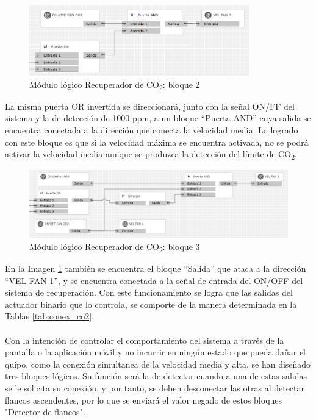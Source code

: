 \begin{figure}[H]
\centering
\includegraphics[width=0.85\textwidth]{figures/log_co2_b2.png}   
\caption{Módulo lógico Recuperador de CO\textsubscript{2}: bloque 2}
\label{fig:log_co2_b2}
\end{figure}
La misma puerta OR invertida se direccionará,  junto con la señal ON/FF del sistema y la de detección de 1000 ppm, a un bloque “Puerta AND” cuya salida se encuentra conectada a la dirección que conecta la velocidad media. Lo logrado con este bloque es que si la velocidad máxima se encuentra activada, no se podrá activar la velocidad media aunque se produzca la detección del límite de CO\textsubscript{2}.
\begin{figure}[H]
\centering
\includegraphics[width=1\textwidth]{figures/log_co2_b3.png}   
\caption{Módulo lógico Recuperador de CO\textsubscript{2}: bloque 3}
\label{fig:log_co2_b3}
\end{figure}
En la Imagen \ref{fig:log_co2_b2} también se encuentra el bloque “Salida” que ataca a la dirección “VEL FAN 1”, y se encuentra conectada a la señal de entrada del ON/OFF del sistema de recuperación. Con este funcionamiento se logra que las salidas del actuador binario que lo controla, se comporte de la manera determinada en la Tablas \ref{tab:conex_co2}.\\\\
Con la intención de controlar el comportamiento del sistema a través de la pantalla o la aplicación móvil y no incurrir en ningún estado que pueda dañar el quipo, como la conexión simultanea de la velocidad media y alta, se han diseñado tres bloques lógicos. Su función será la de detectar cuando a una de estas salidas se le solicita su conexión, y por tanto, se deben desconectar las otras al detectar flancos ascendentes, por lo que se enviará el valor negado de estos bloques "Detector de flancos".
